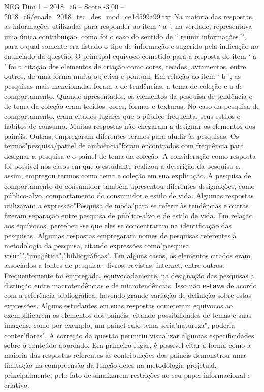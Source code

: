 \begin{textsample}{NEG Dim 1 – 2018\_c6 – Score -3.00 – 2018\_c6/enade\_2018\_tec\_des\_mod\_ce1d599a99.txt}
Na maioria das respostas, as informações utilizadas para responder ao item ‘ a ’, na verdade, representava uma única contribuição, como foi o caso do sentido de “ reunir informações ”, para o qual somente era listado o tipo de informação e sugerido pela indicação no enunciado da questão.
O principal equívoco cometido para a resposta do item ‘ a ’ foi a citação dos elementos de criação como cores, tecidos, aviamentos, entre outros, de uma forma muito objetiva e pontual.
Em relação ao item ‘ b ’, as pesquisas mais mencionadas foram a de tendências, a tema de coleção e a de comportamento.
Quando apresentados, os elementos da pesquisa de tendência e de tema da coleção eram tecidos, cores, formas e texturas.
No caso da pesquisa de comportamento, eram citados lugares que o público frequenta, seus estilos e hábitos de consumo.
Muitas respostas não chegaram a designar os elementos dos painéis.
Outras, empregaram diferentes termos para aludir às pesquisas.
Os termos"pesquisa/painel de ambiência"foram encontrados com frequência para designar a pesquisa e o painel de tema da coleção.
A consideração como resposta foi possível nos casos em que o estudante realizou a descrição da pesquisa e, assim, empregou termos como tema e coleção em sua explicação.
A pesquisa de comportamento do consumidor também apresentou diferentes designações, como público-alvo, comportamento do consumidor e estilo de vida.
Algumas respostas utilizaram a expressão"Pesquisa de moda"para se referir às tendências e outras fizeram separação entre pesquisa de público-alvo e de estilo de vida.
Em relação aos equívocos, percebeu -se que eles se concentraram na identificação das pesquisas.
Algumas respostas empregaram nomes de pesquisas referentes à metodologia da pesquisa, citando expressões como"pesquisa visual","imagética","bibliográficas".
Em alguns casos, os elementos citados eram associados a fontes de pesquisa : livros, revistas, internet, entre outros.
Frequentemente foi empregada, equivocadamente, na designação das pesquisas a distinção entre macrotendências e de microtendências.
Isso não \textbf{estava} de acordo com a referência bibliográfica, havendo grande variação de definição sobre estas expressões.
Alguns estudantes em suas respostas cometeram equívocos ao exemplificarem os elementos dos painéis, citando possibilidades de temas e suas imagens, como por exemplo, um painel cujo tema seria"natureza", poderia conter"flores".
A correção da questão permitiu visualizar algumas especificidades sobre o conteúdo abordado.
Em primeiro lugar, é possível citar a forma como a maioria das respostas referentes às contribuições dos painéis demonstrou uma limitação na compreensão da função deles na metodologia projetual, principalmente, pelo fato de sinalizarem restrições ao seu papel informacional e criativo.

\end{textsample}
